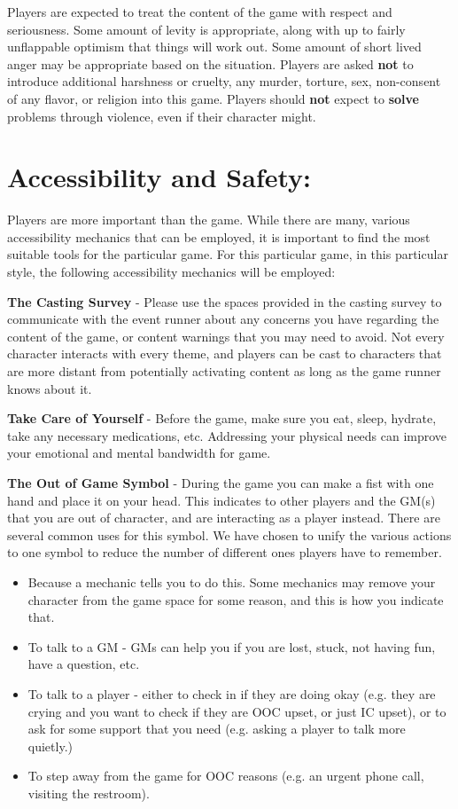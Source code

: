 \documentclass[sheet]{PP}
\begin{document}
Players are expected to treat the content of the game with respect and seriousness. Some amount of levity is appropriate, along with up to fairly unflappable optimism that things will work out. Some amount of short lived anger may be appropriate based on the situation. Players are asked \textbf{not} to introduce additional harshness or cruelty, any murder, torture, sex, non-consent of any flavor, or religion into this game. Players should \textbf{not} expect to \textbf{solve} problems through violence, even if their character might.


\section*{Accessibility and Safety:}
Players are more important than the game. While there are many, various accessibility mechanics that can be employed, it is important to find the most suitable tools for the particular game. For this particular game, in this particular style, the following accessibility mechanics will be employed:
\begin{itemz}
	\item \textbf{The Casting Survey} - Please use the spaces provided in the casting survey to communicate with the event runner about any concerns you have regarding the content of the game, or content warnings that you may need to avoid. Not every character interacts with every theme, and players can be cast to characters that are more distant from potentially activating content as long as the game runner knows about it.
	\item \textbf{Take Care of Yourself }- Before the game, make sure you eat, sleep, hydrate, take any necessary medications, etc. Addressing your physical needs can improve your emotional and mental bandwidth for game.
\end{itemz}
\begin{itemz}
	\item \textbf{The Out of Game Symbol} - During the game you can make a fist with one hand and place it on your head. This indicates to other players and the GM(s) that you are out of character, and are interacting as a player instead. There are several common uses for this symbol. We have chosen to unify the various actions to one symbol to reduce the number of different ones players have to remember.
	\begin{itemize}
		\item Because a mechanic tells you to do this. Some mechanics may remove your character from the game space for some reason, and this is how you indicate that.
		\item To talk to a GM - GMs can help you if you are lost, stuck, not having fun, have a question, etc.
		\item To talk to a player - either to check in if they are doing okay (e.g. they are crying and you want to check if they are OOC upset, or just IC upset), or to ask for some support that you need (e.g. asking a player to talk more quietly.)
		\item To step away from the game for OOC reasons (e.g. an urgent phone call, visiting the restroom).
	\end{itemize}
\end{itemz}
\end{document}
